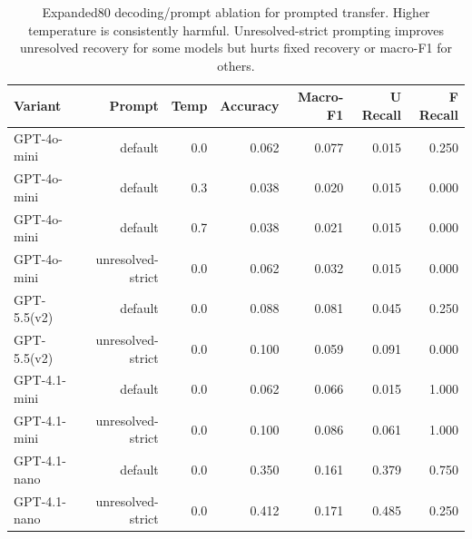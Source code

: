 \begin{table}[t]
\centering
\scriptsize
\setlength{\tabcolsep}{3pt}
\begin{tabular}{lrrrrrr}
\toprule
Variant & Prompt & Temp & Accuracy & Macro-F1 & U Recall & F Recall \\
\midrule
GPT-4o-mini & default & 0.0 & 0.062 & 0.077 & 0.015 & 0.250 \\
GPT-4o-mini & default & 0.3 & 0.038 & 0.020 & 0.015 & 0.000 \\
GPT-4o-mini & default & 0.7 & 0.038 & 0.021 & 0.015 & 0.000 \\
GPT-4o-mini & unresolved-strict & 0.0 & 0.062 & 0.032 & 0.015 & 0.000 \\
GPT-5.5(v2) & default & 0.0 & 0.088 & 0.081 & 0.045 & 0.250 \\
GPT-5.5(v2) & unresolved-strict & 0.0 & 0.100 & 0.059 & 0.091 & 0.000 \\
GPT-4.1-mini & default & 0.0 & 0.062 & 0.066 & 0.015 & 1.000 \\
GPT-4.1-mini & unresolved-strict & 0.0 & 0.100 & 0.086 & 0.061 & 1.000 \\
GPT-4.1-nano & default & 0.0 & 0.350 & 0.161 & 0.379 & 0.750 \\
GPT-4.1-nano & unresolved-strict & 0.0 & 0.412 & 0.171 & 0.485 & 0.250 \\
\bottomrule
\end{tabular}
\caption{Expanded80 decoding/prompt ablation for prompted transfer. Higher temperature is consistently harmful. Unresolved-strict prompting improves unresolved recovery for some models but hurts fixed recovery or macro-F1 for others.}
\label{tab:prompted-llm-temp}
\end{table}
